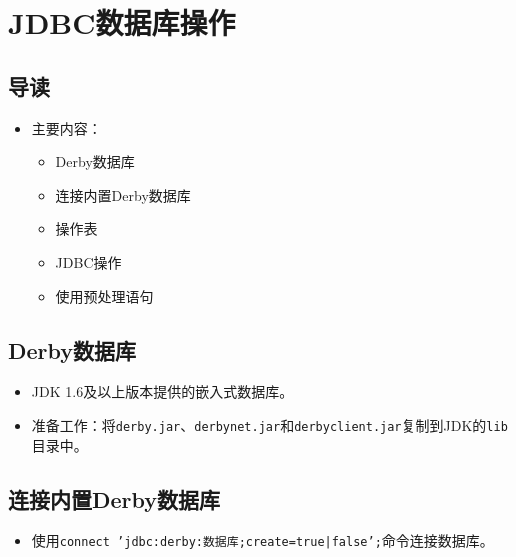 \documentclass[a4paper, 10pt]{ctexart}
\begin{document}
\section{JDBC数据库操作}

\subsection{导读}
\begin{itemize}
  \item 主要内容：
  \begin{itemize}
    \item Derby数据库
    \item 连接内置Derby数据库
    \item 操作表
    \item JDBC操作
    \item 使用预处理语句
  \end{itemize}
\end{itemize}

\subsection{Derby数据库}
\begin{itemize}
  \item JDK 1.6及以上版本提供的嵌入式数据库。
  \item 准备工作：将\texttt{derby.jar}、\texttt{derbynet.jar}和\texttt{derbyclient.jar}复制到JDK的\texttt{lib}目录中。
\end{itemize}

\subsection{连接内置Derby数据库}
\begin{itemize}
  \item 使用\texttt{connect 'jdbc:derby:数据库;create=true|false';}命令连接数据库。
\end{itemize}
\end{document}

